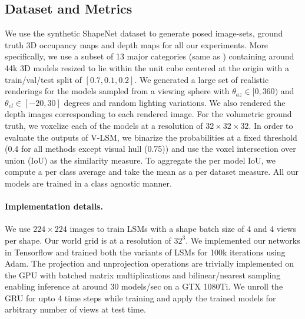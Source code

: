\documentclass[../thesis.tex]{subfiles}
\begin{document}
\subsection{Dataset and Metrics}
We use the synthetic ShapeNet dataset \cite{shapenet2015} to generate posed image-sets, ground truth 3D occupancy maps and depth maps for all our experiments. More specifically, we use a subset of 13 major categories (same as \cite{choy20163d}) containing around 44k 3D models resized to lie within the unit cube centered at the origin with a train/val/test split of $[0.7, 0.1, 0.2]$. We generated a large set of realistic renderings for the models sampled from a viewing sphere with $\theta_{az} \in [0, 360)$ and $\theta_{el} \in [-20, 30]$ degrees and random lighting variations. We also rendered the depth images corresponding to each rendered image. For the volumetric ground truth, we voxelize each of the models at a resolution of $32\times32\times32$. In order to evaluate the outputs of V-LSM, we binarize the probabilities at a fixed threshold (0.4 for all methods except visual hull (0.75)) and use the voxel intersection over union (IoU) as the similarity measure. To aggregate the per model IoU, we compute a per class average and take the mean as a per dataset measure. All our models are trained in a class agnostic manner.

\paragraph{Implementation details.}
We use $224 \times 224$ images to train LSMs with a shape batch size of 4 and 4 views per shape. Our world grid is at a resolution of $32^3$. We implemented our networks in Tensorflow and trained both the variants of LSMs for 100k iterations using Adam. The projection and unprojection operations are trivially implemented on the GPU with batched matrix multiplications and bilinear/nearest sampling enabling inference at around 30 models/sec on a GTX 1080Ti. We unroll the GRU for upto 4 time steps while training and apply the trained models for arbitrary number of views at test time.



\end{document}
